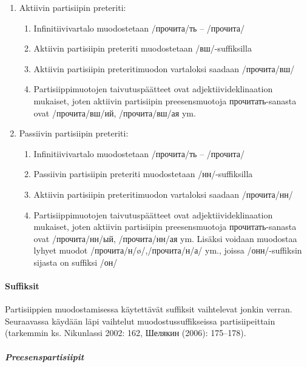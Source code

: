 \documentclass[]{scrartcl}
\providecommand{\tightlist}{%
  \setlength{\itemsep}{0pt}\setlength{\parskip}{0pt}}
\begin{document}
\begin{enumerate}
\def\labelenumi{\alph{enumi})}
\tightlist
\item
  Aktiivin partisiipin preteriti:

  \begin{enumerate}
  \def\labelenumii{\arabic{enumii}.}
  \tightlist
  \item
    Infinitiivivartalo muodostetaan /прочита/ть -- /прочита/
  \item
    Aktiivin partisiipin preteriti muodostetaan /вш/-suffiksilla
  \item
    Aktiivin partisiipin preteritimuodon vartaloksi saadaan /прочита/вш/
  \item
    Partisiippimuotojen taivutuspäätteet ovat adjektiivideklinaation
    mukaiset, joten aktiivin partisiipin preesensmuotoja
    прочитать-sanasta ovat /прочита/вш/ий, /прочита/вш/ая ym.
  \end{enumerate}
\item
  Passiivin partisiipin preteriti:

  \begin{enumerate}
  \def\labelenumii{\arabic{enumii}.}
  \tightlist
  \item
    Infinitiivivartalo muodostetaan /прочита/ть -- /прочита/
  \item
    Passiivin partisiipin preteriti muodostetaan /нн/-suffiksilla
  \item
    Aktiivin partisiipin preteritimuodon vartaloksi saadaan /прочита/нн/
  \item
    Partisiippimuotojen taivutuspäätteet ovat adjektiivideklinaation
    mukaiset, joten aktiivin partisiipin preesensmuotoja
    прочитать-sanasta ovat /прочита/нн/ый, /прочита/нн/ая ym. Lisäksi
    voidaan muodostaa lyhyet muodot /прочита/н/ø/,/прочита/н/а/ ym.,
    joissa /онн/-suffiksin sijasta on suffiksi /он/
  \end{enumerate}
\end{enumerate}

\paragraph{Suffiksit}\label{suffiksit}

Partisiippien muodostamisessa käytettävät suffiksit vaihtelevat jonkin
verran. Seuraavassa käydään läpi vaihtelut muodostussuffikseissa
partisiipeittain (tarkemmin ks. Nikunlassi 2002: 162, Шелякин (2006):
175--178).

\subparagraph{Preesenspartisiipit}\label{preesenspartisiipit}
\end{document}
